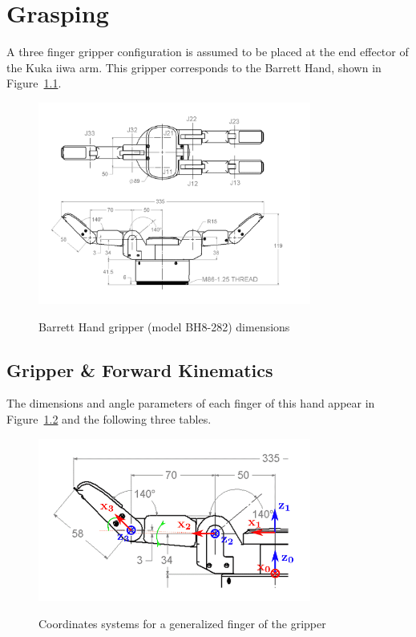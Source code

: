 \chapter{Grasping}
A three finger gripper configuration is assumed to be placed at the end effector of the Kuka iiwa arm. This gripper corresponds to the Barrett Hand, shown in Figure~\ref{fig:barrett_hand}.
\begin{center}
\begin{figure}[htbp]
\centering
\includegraphics[width=0.8\textwidth]{images/bh8-282-dimensions.png}\\
\caption{Barrett Hand gripper (model BH8-282) dimensions}
\label{fig:barrett_hand}
\end{figure}
\end{center}
%
\section{Gripper \& Forward Kinematics}
The dimensions and angle parameters of each finger of this hand appear in Figure~\ref{fig:hand_dimensions} and the following three tables.
\begin{center}
\begin{figure}[htbp]
\centering
\includegraphics[width=0.8\textwidth]{images/bh8-282-generalized-finger-fwd-kin.png}\\
\caption{Coordinates systems for a generalized finger of the gripper}
\label{fig:hand_dimensions}
\end{figure}
\end{center}

